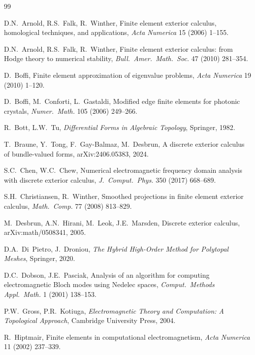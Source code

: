 \documentclass[preprint,12pt]{elsarticle}
\begin{document}


\begin{thebibliography}{99}

D.N.~Arnold, R.S.~Falk, R.~Winther,
Finite element exterior calculus, homological techniques, and applications,
\emph{Acta Numerica} 15 (2006) 1--155.

D.N.~Arnold, R.S.~Falk, R.~Winther,
Finite element exterior calculus: from Hodge theory to numerical stability,
\emph{Bull.\ Amer.\ Math.\ Soc.} 47 (2010) 281--354.

D.~Boffi,
Finite element approximation of eigenvalue problems,
\emph{Acta Numerica} 19 (2010) 1--120.

D.~Boffi, M.~Conforti, L.~Gastaldi,
Modified edge finite elements for photonic crystals,
\emph{Numer.\ Math.} 105 (2006) 249--266.

R.~Bott, L.W.~Tu,
\emph{Differential Forms in Algebraic Topology},
Springer, 1982.

T.~Braune, Y.~Tong, F.~Gay-Balmaz, M.~Desbrun,
A discrete exterior calculus of bundle-valued forms,
arXiv:2406.05383, 2024.

S.C.~Chen, W.C.~Chew,
Numerical electromagnetic frequency domain analysis with discrete exterior calculus,
\emph{J.\ Comput.\ Phys.} 350 (2017) 668--689.

S.H.~Christiansen, R.~Winther,
Smoothed projections in finite element exterior calculus,
\emph{Math.\ Comp.} 77 (2008) 813--829.

M.~Desbrun, A.N.~Hirani, M.~Leok, J.E.~Marsden,
Discrete exterior calculus,
arXiv:math/0508341, 2005.

D.A.~Di~Pietro, J.~Droniou,
\emph{The Hybrid High-Order Method for Polytopal Meshes},
Springer, 2020.

D.C.~Dobson, J.E.~Pasciak,
Analysis of an algorithm for computing electromagnetic Bloch modes using Nedelec spaces,
\emph{Comput.\ Methods Appl.\ Math.} 1 (2001) 138--153.

P.W.~Gross, P.R.~Kotiuga,
\emph{Electromagnetic Theory and Computation: A Topological Approach},
Cambridge University Press, 2004.

R.~Hiptmair,
Finite elements in computational electromagnetism,
\emph{Acta Numerica} 11 (2002) 237--339.


\end{thebibliography}
\end{document}

